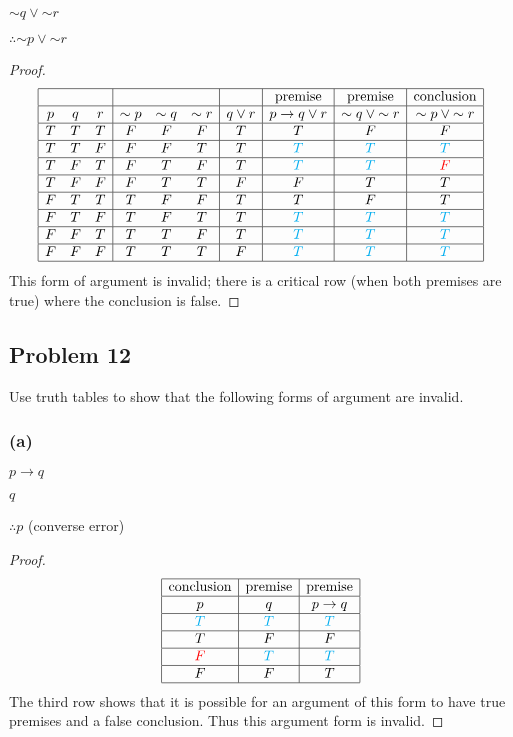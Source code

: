 \documentclass[14pt]{extarticle}
\begin{document}
${\sim q} \vee {\sim r}$

$\therefore {\sim p} \vee {\sim r}$

\begin{proof}
$$
\begin{array}{|ccc|ccc|c|c|c|c|}
\hline
&&&&&&&\text{premise}&\text{premise}&\text{conclusion} \\
\hline
p & q & r & {\sim p} & {\sim q} & {\sim r} & q \vee r & p \to q \vee r & {\sim
q} \vee {\sim r} & {\sim p} \vee {\sim r} \\
\hline
T & T & T & F & F & F & T & T & F & F \\
\hline
T & T & F & F & F & T & T & \color{cyan} T & \color{cyan} T & \color{cyan} T \\
\hline
T & F & T & F & T & F & T & \color{cyan} T & \color{cyan} T & \color{red} F \\
\hline
T & F & F & F & T & T & F & F & T & T \\
\hline
F & T & T & T & F & F & T & T & F & T \\
\hline
F & T & F & T & F & T & T & \color{cyan} T & \color{cyan} T & \color{cyan} T \\
\hline
F & F & T & T & T & F & T & \color{cyan} T & \color{cyan} T & \color{cyan} T \\
\hline
F & F & F & T & T & T & F & \color{cyan} T & \color{cyan} T & \color{cyan} T \\
\hline
\end{array}
$$
This form of argument is invalid; there is a critical row (when both premises
are true) where the conclusion is false.
\end{proof}

\subsection{Problem 12}
Use truth tables to show that the following forms of argument are invalid.

\subsubsection{(a)}
$p \to q$

$q$

$\therefore p$ (converse error)

\begin{proof}
$$
\begin{array}{|c|c|c|}
\hline
\text{conclusion} & \text{premise} & \text{premise} \\
\hline
p & q & p \to q \\
\hline
\color{cyan} T & \color{cyan} T & \color{cyan} T \\
\hline
T & F & F \\
\hline
\color{red} F & \color{cyan} T & \color{cyan} T \\
\hline
F & F & T \\
\hline
\end{array}
$$
The third row shows that it is possible for an argument of this form to have
true premises and a false conclusion. Thus this argument form is invalid.
\end{proof}
\end{document}
